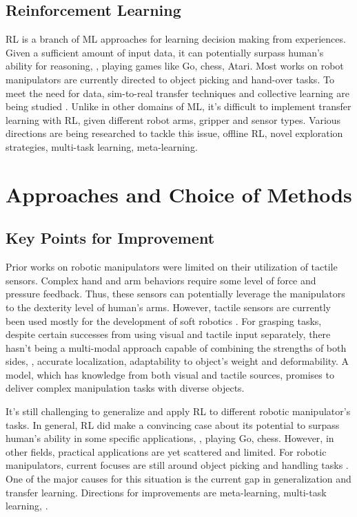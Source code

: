 \subsection{Reinforcement Learning}
\ac{RL} is a branch of \ac{ML} approaches for learning decision making from experiences. Given a sufficient amount of input data, it can potentially surpass human's ability for reasoning, \eg, playing games like Go, chess, Atari. Most works on robot manipulators are currently directed to object picking and hand-over tasks. To meet the need for data, sim-to-real transfer techniques \cite{kleeberger2020survey} and collective learning are being studied \cite{yahya2017collective}. Unlike in other domains of \ac{ML}, it's difficult to implement transfer learning with \ac{RL}, given different robot arms, gripper and sensor types. Various directions are being researched to tackle this issue, \ie offline \ac{RL}, novel exploration strategies, multi-task learning, meta-learning. \cite{kober2013reinforcement, li2017deep, arulkumaran2017deep, singh2021reinforcement}

\section{Approaches and Choice of Methods}
\subsection{Key Points for Improvement}
Prior works on robotic manipulators were limited on their utilization of tactile sensors. Complex hand and arm behaviors require some level of force and pressure feedback. Thus, these sensors can potentially leverage the manipulators to the dexterity level of human's arms. However, tactile sensors are currently been used mostly for the development of soft robotics \cite{haddadin2018tactile}. For grasping tasks, despite certain successes from using visual and tactile input separately, there hasn't being a multi-modal approach capable of combining the strengths of both sides, \ie, accurate localization, adaptability to object's weight and deformability. A model, which has knowledge from both visual and tactile sources, promises to deliver complex manipulation tasks with diverse objects.

It's still challenging to generalize and apply \ac{RL} to different robotic manipulator's tasks. In general, \ac{RL} did make a convincing case about its potential to surpass human's ability in some specific applications, \eg, playing Go, chess. However, in other fields, practical applications are yet scattered and limited. For robotic manipulators, current focuses are still around object picking and handling tasks \cite{singh2021reinforcement}. One of the major causes for this situation is the current gap in generalization and transfer learning. Directions for improvements are meta-learning, multi-task learning, \etc \cite{kober2013reinforcement}.


